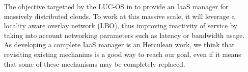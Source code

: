 

				




				





The objective targetted by the LUC-OS in to provide an IaaS manager for 
massively distributed clouds. To work at this massive scale, it will leverage
a locality aware overlay network (LBO), thus improving reactivity of service
by taking into account networking parameters such as latency or bandwidth usage.
As developing a complete IaaS manager is an Herculean work, we think that 
revisiting existing mechanims is a good way to reach our goal, even if it means 
that some of these mechanisms may be completely replaced.

